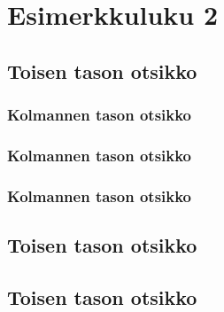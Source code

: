 \lipsum[1]

\chapter{Esimerkkuluku 2}

\lipsum[1]

\section{Toisen tason otsikko}

\lipsum[1]

\subsection{Kolmannen tason otsikko}

\lipsum[3]

\subsection{Kolmannen tason otsikko}

\lipsum[3]

\subsection{Kolmannen tason otsikko}

\lipsum[3]


\section{Toisen tason otsikko}

\lipsum[1]

\section{Toisen tason otsikko}

\lipsum[1]


